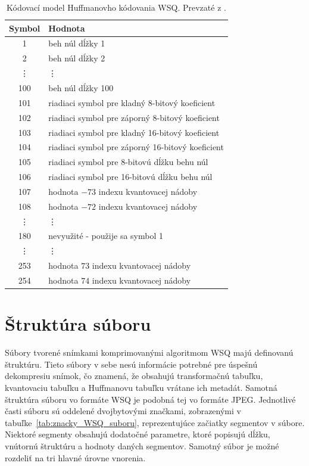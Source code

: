  \begin{table}[ht]
    \centering
    \caption{Kódovací model Huffmanovho kódovania WSQ. Prevzaté z \cite{WSQSpecification}.}
    \begin{tabular}{| c  l |}
      \hline
      \textbf{Symbol} & \textbf{Hodnota} \\
      \hline
      1 & beh núl dĺžky 1 \\
      2 & beh núl dĺžky 2 \\
      \vdots & \vdots \\
      100 & beh núl dĺžky 100 \\
      101 & riadiaci symbol pre kladný 8-bitový koeficient  \\
      102 & riadiaci symbol pre záporný 8-bitový koeficient \\
      103 & riadiaci symbol pre kladný 16-bitový koeficient \\
      104 & riadiaci symbol pre záporný 16-bitový koeficient \\
      105 & riadiaci symbol pre 8-bitovú dĺžku behu núl \\
      106 & riadiaci symbol pre 16-bitovú dĺžku behu núl \\
      107 & hodnota $-73$ indexu kvantovacej nádoby \\
      108 & hodnota $-72$ indexu kvantovacej nádoby \\
      \vdots & \vdots \\
      180 & nevyužité - použije sa symbol 1 \\
      \vdots & \vdots \\
      253 & hodnota $73$ indexu kvantovacej nádoby \\
      254 & hodnota $74$ indexu kvantovacej nádoby \\
      \hline
    \end{tabular}
    \label{tab:kodovaci_model}
  \end{table}

  \section{Štruktúra súboru} \label{sec:struktura}
  Súbory tvorené snímkami komprimovanými algoritmom WSQ majú definovanú štruktúru. Tieto súbory v sebe nesú informácie potrebné pre úspešnú
  dekompresiu snímok, čo znamená, že obsahujú transformačnú tabuľku, kvantovaciu tabuľku a Huffmanovu tabuľku vrátane ich metadát.
  Samotná štruktúra súboru vo formáte WSQ je podobná tej vo formáte JPEG. Jednotlivé časti súboru sú oddelené dvojbytovými značkami,
  zobrazenými v tabuľke~{\ref{tab:znacky_WSQ_suboru}}, reprezentujúce začiatky segmentov v súbore. Niektoré segmenty obsahujú dodatočné parametre,
  ktoré popisujú dĺžku, vnútornú štruktúru a hodnoty daných segmentov. Samotný súbor je možné rozdeliť na tri hlavné úrovne vnorenia.

